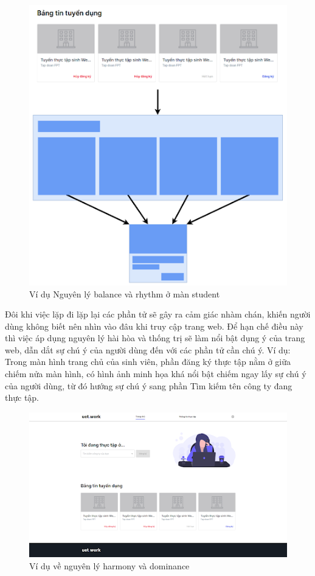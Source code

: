\documentclass[./../main.tex]{subfiles}
\begin{document}
\begin{figure}[H]
	\includegraphics[width=\linewidth]{./images/image34.png}
	\caption{Ví dụ Nguyên lý balance và rhythm ở màn student}
	\label{fig:example_rhythm_syudent}
\end{figure}

Đôi khi việc lặp đi lặp lại các phần tử sẽ gây ra cảm giác nhàm chán, khiến người dùng không biết nên nhìn vào đâu khi truy cập trang web. Để hạn chế điều này thì việc áp dụng nguyên lý hài hòa và thống trị sẽ làm nổi bật dụng ý của trang web, dẫn dắt sự chú ý của người dùng đến với các phần tử cần chú ý. Ví dụ: Trong màn hình trang chủ của sinh viên, phần đăng ký thực tập nằm ở giữa chiếm nửa màn hình, có hình ảnh minh họa khá nổi bật chiếm ngay lấy sự chú ý của người dùng, từ đó hướng sự chú ý sang phần Tìm kiếm tên công ty đang thực tập.

\begin{figure}[H]
	\includegraphics[width=\linewidth]{./images/image35.png}
	\caption{Ví dụ về nguyên lý harmony và dominance}
	\label{fig:example_harmony_dominance}
\end{figure}
\end{document}
